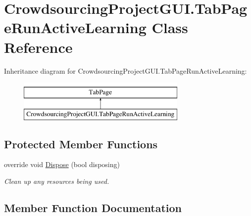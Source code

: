 \hypertarget{class_crowdsourcing_project_g_u_i_1_1_tab_page_run_active_learning}{}\section{Crowdsourcing\+Project\+G\+U\+I.\+Tab\+Page\+Run\+Active\+Learning Class Reference}
\label{class_crowdsourcing_project_g_u_i_1_1_tab_page_run_active_learning}
Inheritance diagram for Crowdsourcing\+Project\+G\+U\+I.\+Tab\+Page\+Run\+Active\+Learning\+:\begin{figure}[H]
\begin{center}
\leavevmode
\includegraphics[height=2.000000cm]{class_crowdsourcing_project_g_u_i_1_1_tab_page_run_active_learning}
\end{center}
\end{figure}
\subsection*{Protected Member Functions}
\begin{DoxyCompactItemize}
\item 
override void \hyperlink{class_crowdsourcing_project_g_u_i_1_1_tab_page_run_active_learning_a84dba3f626a02332c9a8b7fdd27c53a5}{Dispose} (bool disposing)
\begin{DoxyCompactList}\small\item\em Clean up any resources being used. \end{DoxyCompactList}\end{DoxyCompactItemize}


\subsection{Member Function Documentation}
\hypertarget{class_crowdsourcing_project_g_u_i_1_1_tab_page_run_active_learning_a84dba3f626a02332c9a8b7fdd27c53a5}{}
